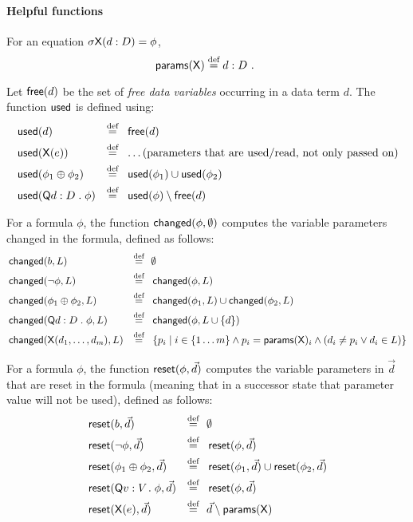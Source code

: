 \documentclass{article}
\begin{document}
\paragraph{Helpful functions}
For an equation $\sigma \propvar{X}(d \oftype D) = \phi$,
\[ \params(\propvar{X}) \eqdef d \oftype D \text{ . } \]

Let $\free(d)$ be the set of \emph{free data variables} occurring in a data term $d$. The function $\used$ is defined using:
\begin{align*}
& \used(d)                                      & \eqdef\eqsep & \free(d) \\
& \used(\propvar{X}(e))                         & \eqdef\eqsep & \ldots \text{(parameters that are used/read, not only passed on)} \\
& \used(\phi_1 \oplus \phi_2)                   & \eqdef\eqsep & \used(\phi_1) \cup \used(\phi_2) \\
& \used(\mathsf{Q} d \oftype D \suchthat \phi)  & \eqdef\eqsep & \used(\phi) \setminus \free(d)
\end{align*}

For a formula $\phi$, the function $\changed(\phi,\emptyset)$
computes the variable parameters changed in the formula, defined as follows:
\begin{align*}
& \changed(b, L)                                      & \eqdef\eqsep & \emptyset \\
& \changed(\neg \phi, L)                              & \eqdef\eqsep & \changed(\phi, L) \\
& \changed(\phi_1 \oplus \phi_2, L)                       & \eqdef\eqsep & \changed(\phi_1, L) \cup \changed(\phi_2, L) \\
& \changed(\mathsf{Q} d \oftype D \suchthat \phi, L)  & \eqdef\eqsep & \changed(\phi, L \cup \set{d}) \\
& \changed(\propvar{X}(d_1, \ldots, d_m), L)          & \eqdef\eqsep & \set{p_i \mid i \in \set{1 \ldots m} \land p_i = \params(\propvar{X})_i \land ( d_i \neq p_i \lor d_i \in L ) }
\end{align*}

For a formula $\phi$, the function $\reset(\phi,\vec{d})$
computes the variable parameters in $\vec{d}$ that are reset in the formula (meaning that in a successor state that parameter value will not be used), defined as follows:
\begin{align*}
& \reset(b, \vec{d})                                      & \eqdef\eqsep & \emptyset \\
& \reset(\neg \phi, \vec{d})                              & \eqdef\eqsep & \reset(\phi, \vec{d}) \\
& \reset(\phi_1 \oplus \phi_2, \vec{d})                       & \eqdef\eqsep & \reset(\phi_1, \vec{d}) \cup \reset(\phi_2, \vec{d}) \\
& \reset(\mathsf{Q} v \oftype V \suchthat \phi, \vec{d})  & \eqdef\eqsep & \reset(\phi, \vec{d}) \\
& \reset(\propvar{X}(e), \vec{d})          & \eqdef\eqsep &  \vec{d} \setminus \params(\propvar{X}) 
\end{align*}
\end{document}
